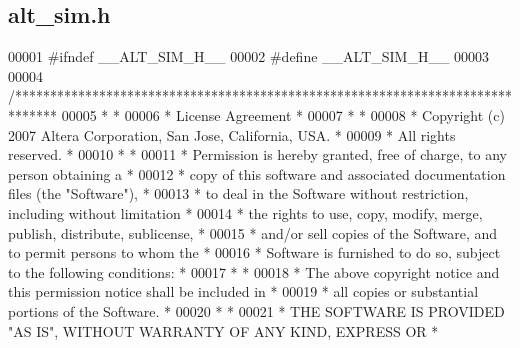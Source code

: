 \subsection{alt\+\_\+sim.\+h}
\label{alt__sim_8h_source}

\begin{DoxyCode}
00001 \textcolor{preprocessor}{#ifndef \_\_ALT\_SIM\_H\_\_}
00002 \textcolor{preprocessor}{#define \_\_ALT\_SIM\_H\_\_}
00003 
00004 \textcolor{comment}{/******************************************************************************}
00005 \textcolor{comment}{*                                                                             *}
00006 \textcolor{comment}{* License Agreement                                                           *}
00007 \textcolor{comment}{*                                                                             *}
00008 \textcolor{comment}{* Copyright (c) 2007      Altera Corporation, San Jose, California, USA.      *}
00009 \textcolor{comment}{* All rights reserved.                                                        *}
00010 \textcolor{comment}{*                                                                             *}
00011 \textcolor{comment}{* Permission is hereby granted, free of charge, to any person obtaining a     *}
00012 \textcolor{comment}{* copy of this software and associated documentation files (the "Software"),  *}
00013 \textcolor{comment}{* to deal in the Software without restriction, including without limitation   *}
00014 \textcolor{comment}{* the rights to use, copy, modify, merge, publish, distribute, sublicense,    *}
00015 \textcolor{comment}{* and/or sell copies of the Software, and to permit persons to whom the       *}
00016 \textcolor{comment}{* Software is furnished to do so, subject to the following conditions:        *}
00017 \textcolor{comment}{*                                                                             *}
00018 \textcolor{comment}{* The above copyright notice and this permission notice shall be included in  *}
00019 \textcolor{comment}{* all copies or substantial portions of the Software.                         *}
00020 \textcolor{comment}{*                                                                             *}
00021 \textcolor{comment}{* THE SOFTWARE IS PROVIDED "AS IS", WITHOUT WARRANTY OF ANY KIND, EXPRESS OR  *}

\end{DoxyCode}
